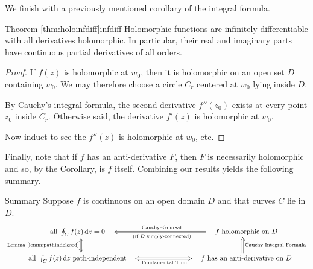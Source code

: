 We finish with a previously mentioned corollary of the integral formula.

\begin{cor}{Theorem \ref{thm:holoinfdiff}}{infdiff}
	Holomorphic functions are infinitely differentiable with all derivatives holomorphic. In particular, their real and imaginary parts have continuous partial derivatives of all orders.
\end{cor}


\begin{proof}
	If $f(z)$ is holomorphic at $w_0$, then it is holomorphic on an open set $D$ containing $w_0$. We may therefore choose a circle $C_r$ centered at $w_0$ lying inside $D$.\par
	By Cauchy's integral formula, the second derivative $f''(z_0)$ exists at every point $z_0$ inside $C_r$. Otherwise said, the derivative $f'(z)$ is holomorphic at $w_0$.\par
	Now induct to see the $f''(z)$ is holomorphic at $w_0$, etc.
\end{proof}

\goodbreak

Finally, note that if $f$ has an anti-derivative $F$, then $F$ is necessarily holomorphic and so, by the Corollary, is $f$ itself. Combining our results yields the following summary.

\begin{thm*}{Summary}
	Suppose $f$ is continuous on an open domain $D$ and that curves $C$ lie in $D$.
	\[
		\xymatrix @R20pt @C80pt{%
			\text{all}\ \oint_C f(z)\,\dz=0\quad \ar@{<=>}[d]_{\text{Lemma \ref*{lemm:pathindclosed}}}  & \quad f\ \text{holomorphic on $D$} \ar@{=>}[l]_{\text{Cauchy--Goursat}}^{\text{(if $D$ simply-connected)}}\\
			\text{all}\ \int_C f(z)\,\dz\ \text{path-independent} \quad \ar@{<=>}[r]_{\ \ \text{Fundamental Thm}} & \quad f\ \text{has an anti-derivative on $D$} \ar@{=>}[u]_{\text{Cauchy Integral Formula}} 
		}
	\]
\end{thm*}




 



